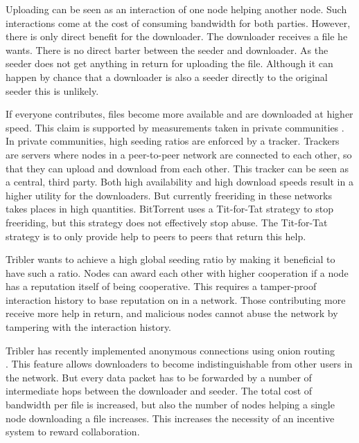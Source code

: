 Uploading can be seen as an interaction of one node helping another node.
Such interactions come at the cost of consuming bandwidth for both parties.
However, there is only direct benefit for the downloader.
The downloader receives a file he wants.
There is no direct barter between the seeder and downloader.
As the seeder does not get anything in return for uploading the file.
Although it can happen by chance that a downloader is also a seeder directly to the original seeder
this is unlikely\cite{Lai-Incentives}.

If everyone contributes, files become more available and are downloaded at higher speed.
This claim is supported by measurements taken in private communities
\cite{meulpolder-privatecommunities}.
In private communities, high seeding ratios are enforced by a tracker.
Trackers are servers where nodes in a peer-to-peer network are connected to each other,
so that they can upload and download from each other\cite{cohen-titfortat}.
This tracker can be seen as a central, third party.
Both high availability and high download speeds result in a higher utility for the downloaders.
But currently freeriding in these networks takes places in high quantities\cite{Adar-Freeriding}.
BitTorrent uses a Tit-for-Tat strategy to stop freeriding,
but this strategy does not effectively stop abuse\cite{Pouwelse-tribler}.
The Tit-for-Tat strategy is to only provide help to peers to peers that return this help\cite{cohen-titfortat}.


Tribler wants to achieve a high global seeding ratio by making it beneficial to have such a ratio.
Nodes can award each other with higher cooperation if a node has a reputation itself of being cooperative.
This requires a tamper-proof interaction history to base reputation on in a network.
Those contributing more receive more help in return,
and malicious nodes cannot abuse the network by tampering with the interaction history.

Tribler has recently implemented anonymous connections using onion routing \\\cite{Plak-anonymous}\cite{ruigrok-anonymous}\cite{tanaskoski-anonymous}.
This feature allows downloaders to become indistinguishable from other users in the network.
But every data packet has to be forwarded
by a number of intermediate hops between the downloader and seeder\cite{Plak-anonymous}\cite{tanaskoski-anonymous}.
The total cost of bandwidth per file is increased,
but also the number of nodes helping a single node downloading a file increases.
This increases the necessity of an incentive system to reward collaboration.

